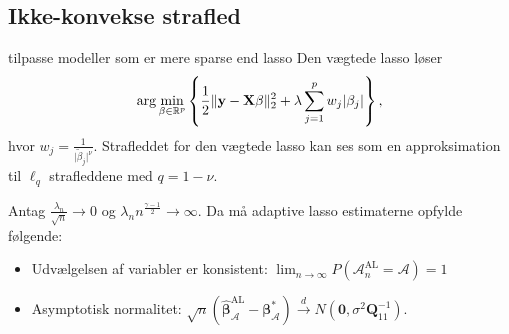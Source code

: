 \subsection{Ikke-konvekse strafled}

tilpasse modeller som er mere sparse end lasso
Den vægtede lasso løser
\begin{align*}
\arg \min_{\beta \in \R^p} \cbr{\frac{1}{2} \Vert \y - \X \beta \Vert_2^2 + \lambda \sum_{j=1}^p w_j \vert \beta_j \vert},
\end{align*}
hvor $w_j = \frac{1}{\vert \tilde{\beta}_j \vert^\nu}$.
Strafleddet for den vægtede lasso kan ses som en approksimation til $\ell_q$ strafleddene med $q=1-\nu$.

\citep{adaptive}
\begin{thm}\label{thm:ALoracle}
Antag $\frac{\lambda_n}{\sqrt{n}} \rightarrow 0$ og $\lambda_n n^\frac{\gamma-1}{2} \rightarrow \infty$. Da må adaptive lasso estimaterne opfylde følgende:
\begin{itemize}
\item Udvælgelsen af variabler er konsistent: $\lim_{n \rightarrow \infty} P(\mathcal{A}_n^\text{AL}=\mathcal{A})=1$
\item Asymptotisk normalitet: $\sqrt{n}\left( \hat{\boldsymbol{\beta}}_\mathcal{A}^{\text{AL}}-\boldsymbol{\beta}_\mathcal{A}^* \right) \overset{d}{\rightarrow} N(\textbf{0},\sigma^2 \boldsymbol{Q}_{11}^{-1}).$
\end{itemize} 
\end{thm}

